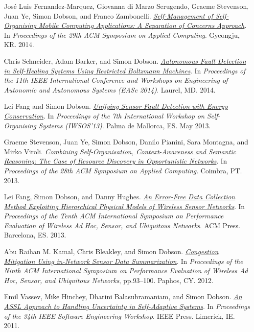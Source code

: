 \documentclass[11pt]{article}
\begin{document}
\label{orgebb594b}José Luis Fernandez-Marquez, Giovanna di Marzo Serugendo, Graeme Stevenson, Juan Ye, Simon Dobson, and Franco Zambonelli.  \emph{\href{https://simondobson.org/softcopy/SAC-PSC2014.pdf}{Self-Management of Self-Organising Mobile Computing Applications: A Separation of Concerns Approach}}. In \emph{Proceedings of the 29th ACM Symposium on Applied Computing}. Gyeongju, KR. 2014.

\label{orgae91fff}Chris Schneider, Adam Barker, and Simon Dobson.  \emph{\href{https://simondobson.org/softcopy/faults-ease-14.pdf}{Autonomous Fault Detection in Self-Healing Systems Using Restricted Boltzmann Machines}}. In \emph{Proceedings of the 11th IEEE International Conference and Workshops on Engineering of Autonomic and Autonomous Systems (EASe 2014)}. Laurel, MD. 2014.

\label{orgd55d2a2}Lei Fang and Simon Dobson.  \emph{\href{https://simondobson.org/softcopy/iwsos-faults-energy.pdf}{Unifying Sensor Fault Detection with Energy Conservation}}. In \emph{Proceedings of the 7th International Workshop on Self-Organising Systems (IWSOS’13)}. Palma de Mallorca, ES. May 2013.

\label{org499c957}Graeme Stevenson, Juan Ye, Simon Dobson, Danilo Pianini, Sara Montagna, and Mirko Viroli.  \emph{\href{https://simondobson.org/softcopy/sac-2013.pdf}{Combining Self-Organisation, Context-Awareness and Semantic Reasoning: The Case of Resource Discovery in Opportunistic Networks}}. In \emph{Proceedings of the 28th ACM Symposium on Applied Computing}. Coimbra, PT. 2013.

\label{orgd87e642}Lei Fang, Simon Dobson, and Danny Hughes.  \emph{\href{https://simondobson.org/softcopy/pewasun13.pdf}{An Error-Free Data Collection Method Exploiting Hierarchical Physical Models of Wireless Sensor Networks}}. In \emph{Proceedings of the Tenth ACM International Symposium on Performance Evaluation of Wireless Ad Hoc, Sensor, and Ubiquitous Networks}. ACM Press. Barcelona, ES. 2013.

\label{org2baa176}Abu Raihan M. Kamal, Chris Bleakley, and Simon Dobson.  \emph{\href{https://dx.doi.org//10.1145/2387027.2387043}{Congestion Mitigation Using in-Network Sensor Data Summarization}}. In \emph{Proceedings of the Ninth ACM International Symposium on Performance Evaluation of Wireless Ad Hoc, Sensor, and Ubiquitous Networks}, pp.93–100. Paphos, CY. 2012.

\label{org18edc28}Emil Vassev, Mike Hinchey, Dharini Balasubramaniam, and Simon Dobson.  \emph{\href{https://simondobson.org/softcopy/assl-sew11.pdf}{An ASSL Approach to Handling Uncertainty in Self-Adaptive Systems}}. In \emph{Proceedings of the 34th IEEE Software Engineering Workshop}. IEEE Press. Limerick, IE. 2011.
\end{document}
